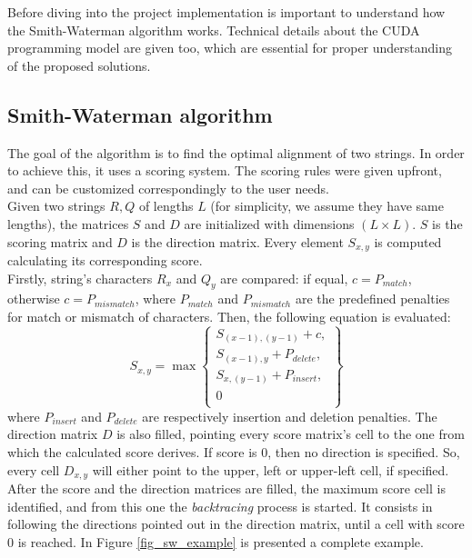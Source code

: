 \documentclass{article}
\begin{document}
Before diving into the project implementation is important to understand how the Smith-Waterman algorithm works. Technical details about the CUDA programming model are given too, which are essential for proper understanding of the proposed solutions.

\subsection{Smith-Waterman algorithm}
\noindent
The goal of the algorithm is to find the optimal alignment of two strings. In order to achieve this, it uses a scoring system. The scoring rules were given upfront, and can be customized correspondingly to the user needs.\\
Given two strings \(R, Q\) of lengths \(L\) (for simplicity, we assume they have same lengths), the matrices \(S\) and \(D\) are initialized with dimensions \((L \times L)\). \(S\) is the scoring matrix and \(D\) is the direction matrix. Every element \(S_{x,y}\) is computed calculating its corresponding score.\\
Firstly, string's characters \(R_x\) and \(Q_y\) are compared: if equal, \(c = P_{match}\), otherwise \(c = P_{mismatch}\), where \(P_{match}\) and \(P_{mismatch}\) are the predefined penalties for match or mismatch of characters. Then, the following equation is evaluated:
\[
S_{x,y} = \max\left\{\begin{array}{lr}
    S_{(x-1),(y-1)}+c, \\
    S_{(x-1),y} + P_{delete}, \\
    S_{x,(y-1)} + P_{insert}, \\
    0\\
    \end{array}\right\}
\]
where \(P_{insert}\) and \(P_{delete}\) are respectively insertion and deletion penalties.
The direction matrix \(D\) is also filled, pointing every score matrix's cell to the one from which the calculated score derives. If score is 0, then no direction is specified. So, every cell \(D_{x,y}\) will either point to the upper, left or upper-left cell, if specified.\\
After the score and the direction matrices are filled, the maximum score cell is identified, and from this one the \textit{backtracing} process is started. It consists in following the directions pointed out in the direction matrix, until a cell with score 0 is reached. In Figure \ref{fig_sw_example} is presented a complete example.
\end{document}
